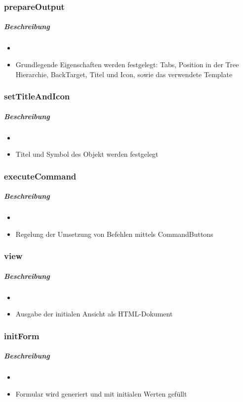 \subsubsection*{prepareOutput}\label{prepareOutputLGUI}
\subparagraph{Beschreibung}
\begin{itemize}
	\item[] \noindent{} 
	\item[] Grundlegende Eigenschaften werden festgelegt: Tabs, Position in der Tree Hierarchie, BackTarget, Titel und Icon, sowie das verwendete Template
\end{itemize}

\subsubsection*{setTitleAndIcon}\label{setTitleAndIconLGUI}
\subparagraph{Beschreibung}
\begin{itemize}
	\item[] \noindent{} 
	\item[] Titel und Symbol des Objekt werden festgelegt
\end{itemize}

\subsubsection*{executeCommand}\label{executeCommandLGUI}
\subparagraph{Beschreibung}
\begin{itemize}
	\item[] \noindent{} 
	\item[] Regelung der Umsetzung von Befehlen mittels CommandButtons
\end{itemize}

\subsubsection*{view}\label{viewLGUI}
\subparagraph{Beschreibung}
\begin{itemize}
	\item[] \noindent{} 
	\item[] Ausgabe der initialen Ansicht als HTML-Dokument
\end{itemize}

\subsubsection*{initForm}\label{initFormLGUI}
\subparagraph{Beschreibung}
\begin{itemize}
	\item[] \noindent{} 
	\item[] Formular wird generiert und mit initialen Werten gefüllt
\end{itemize}

